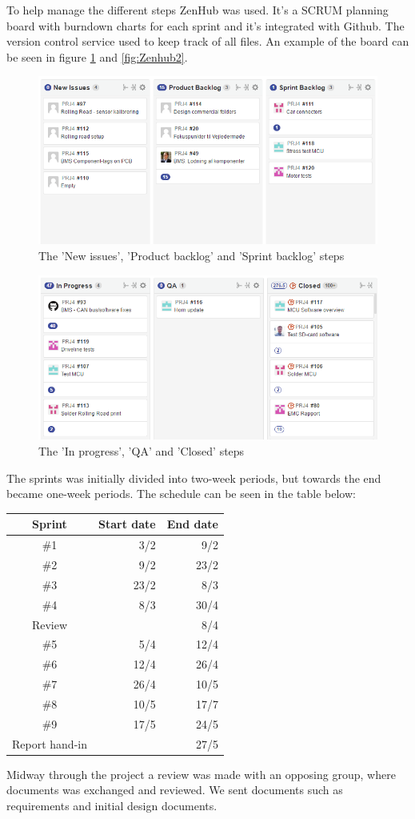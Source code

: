 To help manage the different steps ZenHub\cite{Zenhub} was used. It's a SCRUM planning board with burndown charts for each sprint and it's integrated with Github\cite{Github}. The version control service used to keep track of all files. An example of the board can be seen in figure \ref{fig:Zenhub1} and \vref{fig:Zenhub2}.

\begin{figure}
	\centering
	\includegraphics[width=0.7\linewidth]{SubPages/Images/Zenhub1}
	\caption{The 'New issues', 'Product backlog' and 'Sprint backlog' steps}
	\label{fig:Zenhub1}
\end{figure}

\begin{figure}
	\centering
	\includegraphics[width=0.7\linewidth]{SubPages/Images/Zenhub2}
	\caption{The 'In progress', 'QA' and 'Closed' steps}
	\label{fig:Zenhub2}
\end{figure}

The sprints was initially divided into two-week periods, but towards the end became one-week periods. The schedule can be seen in the table below:

\begin{tabular}{|c|r|r|}
	\hline \textbf{Sprint} & \textbf{Start date} & \textbf{End date} \\ 
	\hline \#1 & 3/2 & 9/2 \\ 
	\hline \#2 & 9/2 & 23/2 \\ 
	\hline \#3 & 23/2 & 8/3 \\ 
	\hline \#4 & 8/3 & 30/4 \\ 
	\hline Review & & 8/4 \\
	\hline \#5 & 5/4 & 12/4 \\ 
	\hline \#6 & 12/4 & 26/4 \\ 
	\hline \#7 & 26/4 & 10/5 \\ 
	\hline \#8 & 10/5 & 17/7 \\ 
	\hline \#9 & 17/5 & 24/5 \\ 
	\hline Report hand-in &  & 27/5 \\ 
	\hline 
\end{tabular} 

Midway through the project a review was made with an opposing group, where documents was exchanged and reviewed. We sent documents such as requirements and initial design documents.